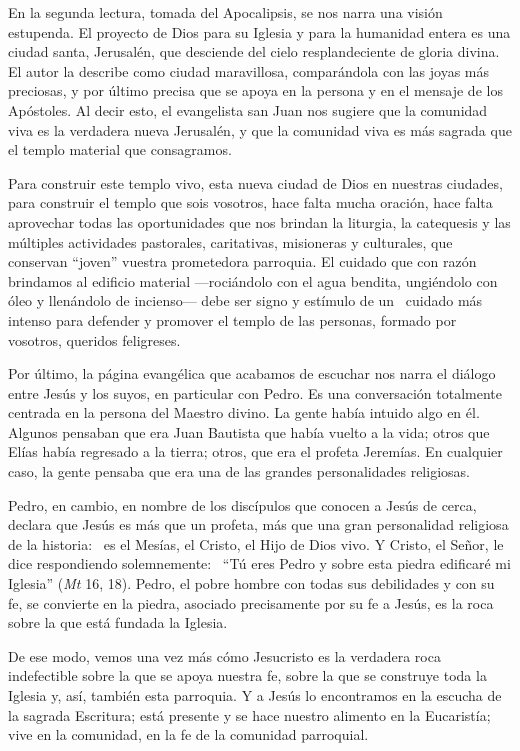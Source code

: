 En la segunda lectura, tomada del Apocalipsis, se nos narra una visión
estupenda. El proyecto de Dios para su Iglesia y para la humanidad
entera es una ciudad santa, Jerusalén, que desciende del cielo
resplandeciente de gloria divina. El autor la describe como ciudad
maravillosa, comparándola con las joyas más preciosas, y por último
precisa que se apoya en la persona y en el mensaje de los Apóstoles. Al
decir esto, el evangelista san Juan nos sugiere que la comunidad viva es
la verdadera nueva Jerusalén, y que la comunidad viva es más sagrada que
el templo material que consagramos.

Para construir este templo vivo, esta nueva ciudad de Dios en nuestras
ciudades, para construir el templo que sois vosotros, hace falta mucha
oración, hace falta aprovechar todas las oportunidades que nos brindan
la liturgia, la catequesis y las múltiples actividades pastorales,
caritativas, misioneras y culturales, que conservan ``joven'' vuestra
prometedora parroquia. El cuidado que con razón brindamos al edificio
material ---rociándolo con el agua bendita, ungiéndolo con óleo y
llenándolo de incienso--- debe ser signo y estímulo de un ~cuidado más
intenso para defender y promover el templo de las personas, formado por
vosotros, queridos feligreses.

Por último, la página evangélica que acabamos de escuchar nos narra el
diálogo entre Jesús y los suyos, en particular con Pedro. Es una
conversación totalmente centrada en la persona del Maestro divino. La
gente había intuido algo en él. Algunos pensaban que era Juan Bautista
que había vuelto a la vida; otros que Elías había regresado a la tierra;
otros, que era el profeta Jeremías. En cualquier caso, la gente pensaba
que era una de las grandes personalidades religiosas.

Pedro, en cambio, en nombre de los discípulos que conocen a Jesús de
cerca, declara que Jesús es más que un profeta, más que una gran
personalidad religiosa de la historia:~ es el Mesías, el Cristo, el Hijo
de Dios vivo. Y Cristo, el Señor, le dice respondiendo solemnemente:~
``Tú eres Pedro y sobre esta piedra edificaré mi Iglesia'' (\emph{Mt}
16, 18). Pedro, el pobre hombre con todas sus debilidades y con su fe,
se convierte en la piedra, asociado precisamente por su fe a Jesús, es
la roca sobre la que está fundada la Iglesia.

De ese modo, vemos una vez más cómo Jesucristo es la verdadera roca
indefectible sobre la que se apoya nuestra fe, sobre la que se construye
toda la Iglesia y, así, también esta parroquia. Y a Jesús lo encontramos
en la escucha de la sagrada Escritura; está presente y se hace nuestro
alimento en la Eucaristía; vive en la comunidad, en la fe de la
comunidad parroquial.

